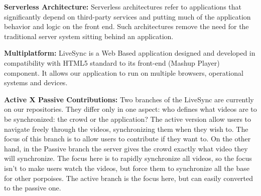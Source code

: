 \textbf{Serverless Architecture:} Serverless architectures refer to applications that significantly depend on third-party services and putting much of the application behavior and logic on the front end. Such architectures remove the need for the traditional server system sitting behind an application.

\textbf{Multiplatform:} LiveSync is a Web Based application designed and developed in compatibility with HTML5 standard to its front-end (Mashup Player) component. It allows our application to run on multiple browsers, operational systems and devices.

\textbf{Active X Passive Contributions:} Two branches of the LiveSync are currently on our repositories. They differ only in one aspect: who defines what videos are to be synchronized: the crowd or the application? The active version allow users to navigate freely through the videos, synchronizing them when they wish to. The focus of this branch is to allow users to contribute if they want to. On the other hand, in the Passive branch the server gives the crowd exactly what video they will synchronize. The focus here is to rapidly synchronize all videos, so the focus isn’t to make users watch the videos, but force them to synchronize all the base for other porpoises. The active branch is the focus here, but can easily converted to the passive one.
